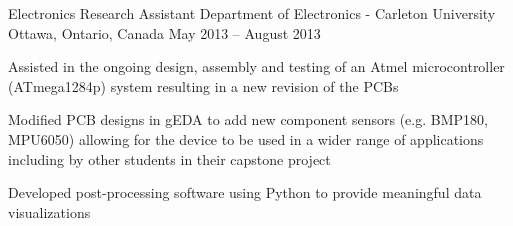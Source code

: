 \begin{cventries}
  \cventry
    {Electronics Research Assistant} %
    {Department of Electronics - Carleton University} %
    {Ottawa, Ontario, Canada} %
    {May 2013 – August 2013} %
    {
      \begin{cvitems} %
        \item {Assisted in the ongoing design, assembly and testing of an Atmel microcontroller (ATmega1284p) system resulting in a new revision of the PCBs}
        \item {Modified PCB designs in gEDA to add new component sensors (e.g. BMP180, MPU6050) allowing for the device to be used in a wider range of applications including by other students in their capstone project}
        \item {Developed post-processing software using Python to provide meaningful data visualizations}
      \end{cvitems}
    }
\end{cventries}
